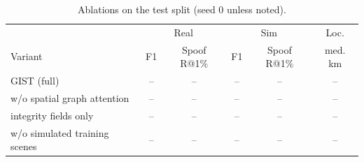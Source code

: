 \begin{table}[t]\centering\small
\caption{Ablations on the test split (seed 0 unless noted).}
\label{tab:ablations}
\begin{tabular}{@{}lccccc@{}}\toprule
 & \multicolumn{2}{c}{Real} & \multicolumn{2}{c}{Sim} & Loc. \\
Variant & F1 & Spoof R@1\% & F1 & Spoof R@1\% & med. km \\\midrule
GIST (full) & -- & -- & -- & -- & -- \\
w/o spatial graph attention & -- & -- & -- & -- & -- \\
integrity fields only & -- & -- & -- & -- & -- \\
w/o simulated training scenes & -- & -- & -- & -- & -- \\
\bottomrule\end{tabular}
\end{table}
